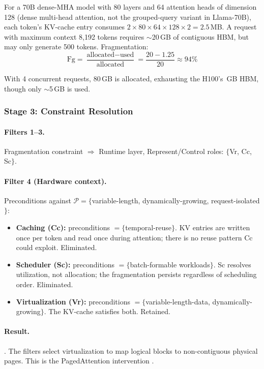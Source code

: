 \documentclass[10pt,twocolumn]{article}
\newcommand{\cvalint}[1]{\pgfmathprintnumber[fixed, precision=0, 1000 sep={\,}]{#1}}
\begin{document}
For a 70B dense-MHA model with 80 layers and 64 attention heads of dimension 128 (dense multi-head attention, not the grouped-query variant in Llama-70B), each token's KV-cache entry consumes $2 \times 80 \times 64 \times 128 \times 2 = 2.5$\,MB. A request with maximum context 8,192 tokens requires $\sim$20\,GB of contiguous HBM, but may only generate 500 tokens. Fragmentation:
\begin{equation*}
\text{Fg} = \frac{\text{allocated} - \text{used}}{\text{allocated}} = \frac{20 - 1.25}{20} \approx 94\%
\end{equation*}

With 4 concurrent requests, 80\,GB is allocated, exhausting the H100's \cvalint{\HhHBMGB}\,GB HBM, though only $\sim$5\,GB is used.

\subsubsection{Stage 3: Constraint Resolution}

\paragraph{Filters 1--3.} Fragmentation constraint $\Rightarrow$ Runtime layer, Represent/Control roles: $\{$Vr, Cc, Sc$\}$.

\paragraph{Filter 4 (Hardware context).} Preconditions against $\mathcal{P} = \{$variable-length, dynamically-growing, request-isolated$\}$:
\begin{itemize}[nosep]
\item \textbf{Caching (Cc):} preconditions $= \{$temporal-reuse$\}$. KV entries are written once per token and read once during attention; there is no reuse pattern Cc could exploit. Eliminated.
\item \textbf{Scheduler (Sc):} preconditions $= \{$batch-formable workloads$\}$. Sc resolves utilization, not allocation; the fragmentation persists regardless of scheduling order. Eliminated.
\item \textbf{Virtualization (Vr):} preconditions $= \{$variable-length-data, dynamically-growing$\}$. The KV-cache satisfies both. Retained.
\end{itemize}

\paragraph{Result.} . The filters select virtualization to map logical blocks to non-contiguous physical pages. This is the PagedAttention intervention \citep{kwon2023}.
\end{document}
